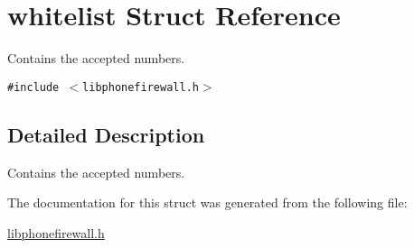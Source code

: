 \hypertarget{structwhitelist}{
\section{whitelist Struct Reference}
\label{structwhitelist}
}
Contains the accepted numbers.  


{\tt \#include $<$libphonefirewall.h$>$}



\subsection{Detailed Description}
Contains the accepted numbers. 

The documentation for this struct was generated from the following file:\begin{CompactItemize}
\item 
\hyperlink{libphonefirewall_8h}{libphonefirewall.h}\end{CompactItemize}
